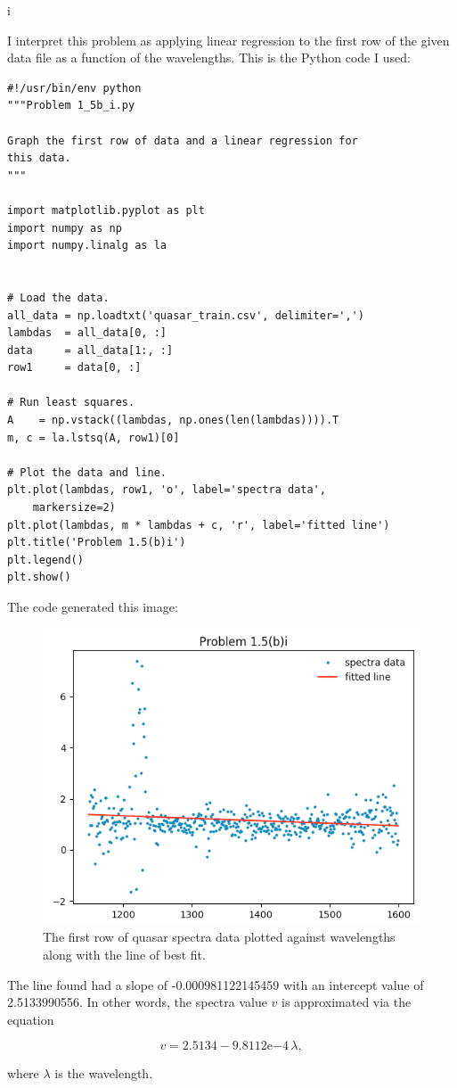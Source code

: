 \documentclass[]{article}
\begin{document}
i

I interpret this problem as applying linear regression to the first row
of the given data file as a function of the wavelengths. This is the
Python code I used:

\begin{verbatim}
#!/usr/bin/env python
"""Problem 1_5b_i.py

Graph the first row of data and a linear regression for
this data.
"""

import matplotlib.pyplot as plt
import numpy as np
import numpy.linalg as la


# Load the data.
all_data = np.loadtxt('quasar_train.csv', delimiter=',')
lambdas  = all_data[0, :]
data     = all_data[1:, :]
row1     = data[0, :]

# Run least squares.
A    = np.vstack((lambdas, np.ones(len(lambdas)))).T
m, c = la.lstsq(A, row1)[0]

# Plot the data and line.
plt.plot(lambdas, row1, 'o', label='spectra data',
    markersize=2)
plt.plot(lambdas, m * lambdas + c, 'r', label='fitted line')
plt.title('Problem 1.5(b)i')
plt.legend()
plt.show()
\end{verbatim}

The code generated this image:

\begin{figure}[htbp]
\centering
\includegraphics{images/pr1_5bi.png}
\caption{The first row of quasar spectra data plotted against
wavelengths along with the line of best fit.}
\end{figure}

The line found had a slope of -0.000981122145459 with an intercept value
of 2.5133990556. In other words, the spectra value \(v\) is approximated
via the equation

\[v = 2.5134 - 9.8112\mathrm{e}{-4} \, \lambda,\]

where \(\lambda\) is the wavelength.
\end{document}
